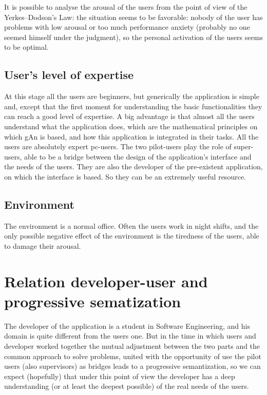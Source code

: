 It is possible to analyse the arousal of the users from the point of view of the Yerkes–Dodson's Law: the situation seems to be favorable: nobody of the user 
has problems with low arousal or too much performance anxiety (probably no one seemed himself under the judgment), so the personal activation of the users seems to be optimal.

\subsection{User's level of expertise }
At this stage all the users are beginners, but generically the application is simple and, except that the first moment for understanding the basic functionalities they can reach a good level of expertise. A big advantage is that almost all the users understand what the application does, which are the mathematical principles on which gAn is based, and how this application is integrated in their tasks.   
All the users are absolutely expert pc-users.
The two pilot-users play the role of super-users, able to be a bridge between the design of the application's interface and the needs of the users. They are also the developer of the pre-existent application, on which the interface is based. So they can be an extremely useful resource.  


\subsection{Environment}
The environment is a normal office. Often the users work in night shifts, and the only possible negative effect of the environment is the tiredness of the users, able to damage their arousal. 

\section{Relation developer-user and progressive sematization}
The developer of the application is a student in Software Engineering, and his domain is quite different from the users one. But in the time in which users and developer worked together the mutual adjustment between the two parts and the common approach to solve problems, united with the opportunity of use the pilot users (also supervisors) as bridges leads to a progressive semantization, so we can expect (hopefully) that under this point of view the developer has a deep understanding (or at least the deepest possible) of the real needs of the users.

